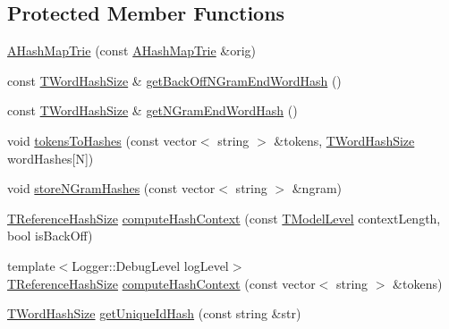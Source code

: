 \subsection*{Protected Member Functions}
\begin{DoxyCompactItemize}
\item 
\hyperlink{classuva_1_1smt_1_1tries_1_1_a_hash_map_trie_a42ba762f7a711f22111b3fefa46d418a}{A\+Hash\+Map\+Trie} (const \hyperlink{classuva_1_1smt_1_1tries_1_1_a_hash_map_trie}{A\+Hash\+Map\+Trie} \&orig)
\item 
const \hyperlink{namespaceuva_1_1smt_1_1hashing_acdc1f2765e669283f8e9c1ed42705314}{T\+Word\+Hash\+Size} \& \hyperlink{classuva_1_1smt_1_1tries_1_1_a_hash_map_trie_aa59ec4b6c4f0cb7eb4f1f4140bf9b9de}{get\+Back\+Off\+N\+Gram\+End\+Word\+Hash} ()
\item 
const \hyperlink{namespaceuva_1_1smt_1_1hashing_acdc1f2765e669283f8e9c1ed42705314}{T\+Word\+Hash\+Size} \& \hyperlink{classuva_1_1smt_1_1tries_1_1_a_hash_map_trie_a0c44c85dd64be9c9238d7313eb4dfcc9}{get\+N\+Gram\+End\+Word\+Hash} ()
\item 
void \hyperlink{classuva_1_1smt_1_1tries_1_1_a_hash_map_trie_a98254f0f1271f1651b3c70acbce8fcb3}{tokens\+To\+Hashes} (const vector$<$ string $>$ \&tokens, \hyperlink{namespaceuva_1_1smt_1_1hashing_acdc1f2765e669283f8e9c1ed42705314}{T\+Word\+Hash\+Size} word\+Hashes\mbox{[}N\mbox{]})
\item 
void \hyperlink{classuva_1_1smt_1_1tries_1_1_a_hash_map_trie_ababc583f0e22e3be69345bb43211fef6}{store\+N\+Gram\+Hashes} (const vector$<$ string $>$ \&ngram)
\item 
\hyperlink{namespaceuva_1_1smt_1_1hashing_a6cc10b288b11b76c718a898b022fbdd1}{T\+Reference\+Hash\+Size} \hyperlink{classuva_1_1smt_1_1tries_1_1_a_hash_map_trie_a1fb2b99ca8211bd45a343922b64cc96f}{compute\+Hash\+Context} (const \hyperlink{namespaceuva_1_1smt_1_1tries_a26064146e98856c7c4185efab0e61a36}{T\+Model\+Level} context\+Length, bool is\+Back\+Off)
\item 
{\footnotesize template$<$Logger\+::\+Debug\+Level log\+Level$>$ }\\\hyperlink{namespaceuva_1_1smt_1_1hashing_a6cc10b288b11b76c718a898b022fbdd1}{T\+Reference\+Hash\+Size} \hyperlink{classuva_1_1smt_1_1tries_1_1_a_hash_map_trie_a9a340430c87c0fb0725004689e8b47a0}{compute\+Hash\+Context} (const vector$<$ string $>$ \&tokens)
\item 
\hyperlink{namespaceuva_1_1smt_1_1hashing_acdc1f2765e669283f8e9c1ed42705314}{T\+Word\+Hash\+Size} \hyperlink{classuva_1_1smt_1_1tries_1_1_a_hash_map_trie_aae50ef05783fc3ca8367610475fe9b40}{get\+Unique\+Id\+Hash} (const string \&str)

\end{DoxyCompactItemize}
